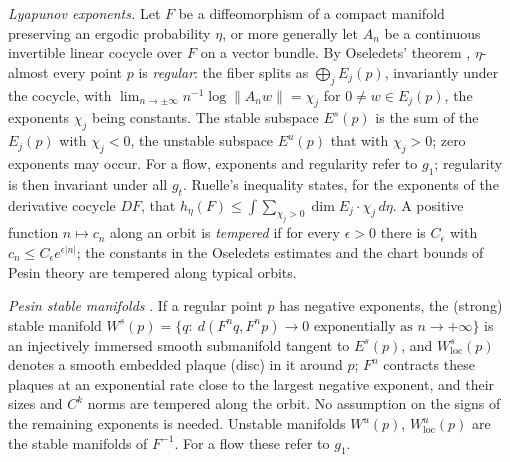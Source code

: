 \documentclass[11pt]{article}
\theoremstyle{remark}
\begin{document}
\emph{Lyapunov exponents.}  Let \(F\) be a diffeomorphism of a
compact manifold preserving an ergodic probability \(\eta\),
or more generally let \(A_n\) be a continuous invertible linear
cocycle over \(F\) on a vector bundle.  By Oseledets' theorem
\cite{Oseledets1968}, \(\eta\)-almost every point
\(p\) is \emph{regular}: the fiber splits as
\(\bigoplus_jE_j(p)\), invariantly under the cocycle, with
\(\lim_{n\to\pm\infty}n^{-1}\log\|A_nw\|=\chi_j\) for
\(0\ne w\in E_j(p)\), the exponents \(\chi_j\) being constants.
The stable subspace \(E^s(p)\) is the sum of the \(E_j(p)\) with
\(\chi_j<0\), the unstable subspace \(E^u(p)\) that with
\(\chi_j>0\); zero exponents may occur.  For a flow, exponents and
regularity refer to \(g_1\); regularity is then
invariant under all \(g_t\).  Ruelle's inequality
\cite{Ruelle1978} states, for the exponents of the derivative
cocycle \(DF\), that
\(h_\eta(F)\le\int\sum_{\chi_j>0}\dim E_j\cdot\chi_j\,d\eta\).
A positive function \(n\mapsto c_n\) along an orbit is
\emph{tempered} if for every \(\epsilon>0\) there is
\(C_\epsilon\) with \(c_n\le C_\epsilon e^{\epsilon|n|}\); the
constants in the Oseledets estimates and the chart bounds of Pesin
theory are tempered along typical orbits.


\emph{Pesin stable manifolds} \cite{Pesin1976}.  If a regular point
\(p\) has negative exponents, the (strong) stable manifold
\(W^s(p)=\{q:\ d(F^nq,F^np)\to0\text{ exponentially as }n\to+\infty\}\)
is an injectively immersed smooth submanifold tangent to
\(E^s(p)\), and \(W^s_{\mathrm{loc}}(p)\) denotes a smooth embedded
plaque (disc) in it around \(p\); \(F^n\) contracts these plaques at
an exponential rate close to the largest negative exponent, and their
sizes and \(C^k\) norms are tempered along the orbit.  No assumption
on the signs of the remaining exponents is needed.
Unstable manifolds \(W^u(p)\), \(W^u_{\mathrm{loc}}(p)\) are the
stable manifolds of \(F^{-1}\).  For a flow these refer to
\(g_1\).

\end{document}
